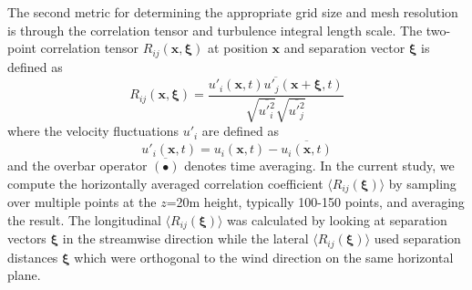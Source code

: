 The second metric for determining the appropriate grid size and mesh
resolution is through the correlation tensor and turbulence integral
length scale.  The two-point correlation tensor
$R_{ij}(\mathbf{x},\boldsymbol{\xi})$ at position $\mathbf{x}$ and
separation vector $\boldsymbol{\xi}$ is defined as
\begin{equation}
  \label{eq:Rij}
  R_{ij}({\mathbf x},\boldsymbol{\xi}) = 
  \frac{\overline{ {u'_i(\mathbf{x}, t) u'_j(\mathbf{x}+\boldsymbol{\xi},t)} }}
       { \sqrt{\overline{ u'^2_i }} \sqrt{\overline{ u'^2_j}} }
\end{equation}
where the velocity fluctuations $u'_i$ are defined as 
\begin{equation}
  u'_i(\mathbf{x},t) = u_i(\mathbf{x},t) - \overline{ u_i(\mathbf{x},t) }
\end{equation}
and the overbar operator $\overline{(\bullet)}$ denotes time
averaging.  In the current study, we compute the horizontally averaged
correlation coefficient $\langle R_{ij}(\boldsymbol{\xi})\rangle$ by
sampling over multiple points at the $z$=20m height, typically 100-150
points, and averaging the result.  The longitudinal $\langle
R_{ij}(\boldsymbol{\xi})\rangle$ was calculated by looking at
separation vectors $\boldsymbol{\xi}$ in the streamwise direction
while the lateral $\langle R_{ij}(\boldsymbol{\xi})\rangle$ used
separation distances $\boldsymbol{\xi}$ which were orthogonal to the
wind direction on the same horizontal plane.

